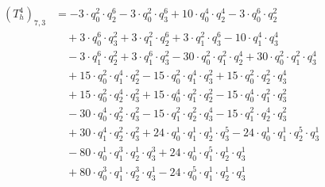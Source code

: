 \begin{align*}(T_{h}^4)_{7,3}&=-3\cdot q_0^{2}\cdot q_2^{6}-3\cdot q_0^{2}\cdot q_3^{6}+10\cdot q_0^{4}\cdot q_2^{4}-3\cdot q_0^{6}\cdot q_2^{2}\\
&\quad +3\cdot q_0^{6}\cdot q_3^{2}+3\cdot q_1^{2}\cdot q_2^{6}+3\cdot q_1^{2}\cdot q_3^{6}-10\cdot q_1^{4}\cdot q_3^{4}\\
&\quad -3\cdot q_1^{6}\cdot q_2^{2}+3\cdot q_1^{6}\cdot q_3^{2}-30\cdot q_0^{2}\cdot q_1^{2}\cdot q_2^{4}+30\cdot q_0^{2}\cdot q_1^{2}\cdot q_3^{4}\\
&\quad +15\cdot q_0^{2}\cdot q_1^{4}\cdot q_2^{2}-15\cdot q_0^{2}\cdot q_1^{4}\cdot q_3^{2}+15\cdot q_0^{2}\cdot q_2^{2}\cdot q_3^{4}\\
&\quad +15\cdot q_0^{2}\cdot q_2^{4}\cdot q_3^{2}+15\cdot q_0^{4}\cdot q_1^{2}\cdot q_2^{2}-15\cdot q_0^{4}\cdot q_1^{2}\cdot q_3^{2}\\
&\quad -30\cdot q_0^{4}\cdot q_2^{2}\cdot q_3^{2}-15\cdot q_1^{2}\cdot q_2^{2}\cdot q_3^{4}-15\cdot q_1^{2}\cdot q_2^{4}\cdot q_3^{2}\\
&\quad +30\cdot q_1^{4}\cdot q_2^{2}\cdot q_3^{2}+24\cdot q_0^{1}\cdot q_1^{1}\cdot q_2^{1}\cdot q_3^{5}-24\cdot q_0^{1}\cdot q_1^{1}\cdot q_2^{5}\cdot q_3^{1}\\
&\quad -80\cdot q_0^{1}\cdot q_1^{3}\cdot q_2^{1}\cdot q_3^{3}+24\cdot q_0^{1}\cdot q_1^{5}\cdot q_2^{1}\cdot q_3^{1}\\
&\quad +80\cdot q_0^{3}\cdot q_1^{1}\cdot q_2^{3}\cdot q_3^{1}-24\cdot q_0^{5}\cdot q_1^{1}\cdot q_2^{1}\cdot q_3^{1}\end{align*}

